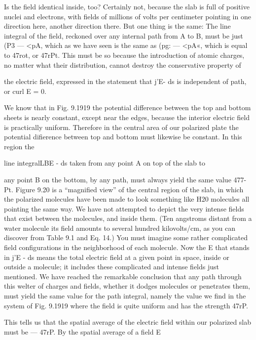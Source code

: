 Is the field identical inside, too? Certainly not, because the slab
is full of positive nuclei and electrons, with fields of millions of volts
per centimeter pointing in one direction here, another direction there.
But one thing is the same: The line integral of the field, reckoned over
any internal path from A to B, must be just (P3  ---  <pA, which as we have
seen is the same as (pg:  ---  <pA«, which is equal to 47rot, or 47rPt. This
must be so because the introduction of atomic charges, no matter
what their distribution, cannot destroy the conservative property of

the electric field, expressed in the statement that j'E- ds is independent
of path, or curl E = 0.

 

 
 

We know that in Fig. 9.1919 the potential difference between the
top and bottom sheets is nearly constant, except near the edges, because
the interior electric field is practically uniform. Therefore in
the central area of our polarized plate the potential difierence between
top and bottom must likewise be constant. In this region the

line integralLBE - ds taken from any point A on top of the slab to

any point B on the bottom, by any path, must always yield the same
value 477-Pt. Figure 9.20 is a ``magnified view'' of the central region
of the slab, in which the polarized molecules have been made to look
something like H20 molecules all pointing the same way. We have
not attempted to depict the very intense fields that exist between the
molecules, and inside them. (Ten angstroms distant from a water
molecule its field amounts to several hundred kilovolts/cm, as you
can discover from Table 9.1 and Eq. 14.) You must imagine some
rather complicated field configurations in the neighborhood of each
molecule. Now the E that stands in j'E - ds means the total electric
field at a given point in space, inside or outside a molecule; it includes
these complicated and intense fields just mentioned. We
have reached the remarkable conclusion that any path through this
welter of charges and fields, whether it dodges molecules or penetrates
them, must yield the same value for the path integral, namely
the value we find in the system of Fig. 9.1919 where the field is quite
uniform and has the strength 47rP.

This tells us that the spatial average of the electric field within our
polarized slab must be  --- 47rP. By the spatial average of a field E

